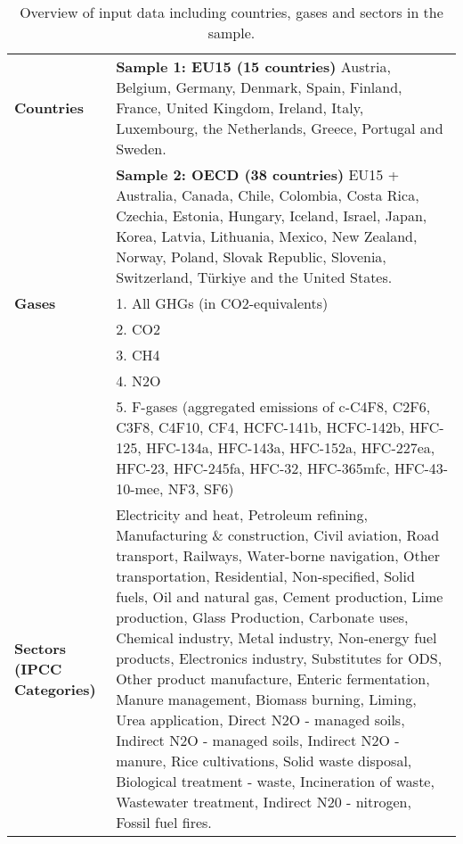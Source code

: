 \documentclass[a4paper]{article}
\begin{document}
\begin{table}
    \centering
    \caption{Overview of input data including countries, gases and sectors in the sample.}
    \renewcommand{\arraystretch}{1.5}
    \begin{adjustbox}{center}
    \begin{tabular}{p{2.5cm} p{14cm}}
    \hline
        \textbf{Countries} & \textbf{Sample 1: EU15 (15 countries)}
                    Austria, Belgium, Germany, Denmark, Spain, Finland, France, United Kingdom, Ireland, Italy, Luxembourg, the Netherlands, Greece, Portugal and Sweden. \\
                  & \textbf{Sample 2: OECD (38 countries)}
                    EU15 + Australia, Canada, Chile, Colombia, Costa Rica, Czechia, Estonia, Hungary, Iceland, Israel, Japan, Korea, Latvia, Lithuania, Mexico, New Zealand, Norway, Poland, Slovak Republic, Slovenia, Switzerland, Türkiye and the United States. \\ \hline
         \textbf{Gases}    & 1. All GHGs (in CO2-equivalents) \\
                  & 2. CO2 \\
                  & 3. CH4 \\
                  & 4. N2O \\
                  & 5. F-gases (aggregated emissions of c-C4F8, C2F6, C3F8, C4F10, CF4, HCFC-141b, HCFC-142b, HFC-125, HFC-134a, HFC-143a, HFC-152a, HFC-227ea, HFC-23, HFC-245fa, HFC-32, HFC-365mfc, HFC-43-10-mee, NF3, SF6) \\ \hline
         \textbf{Sectors (IPCC Categories)} & Electricity and heat, Petroleum refining, Manufacturing \& construction, Civil aviation, Road transport, Railways, Water-borne navigation, Other transportation, Residential, Non-specified, Solid fuels, Oil and natural gas, Cement production, Lime production, Glass Production, Carbonate uses, Chemical industry, Metal industry, Non-energy fuel products, Electronics industry, Substitutes for ODS, Other product manufacture, Enteric fermentation, Manure management, Biomass burning, Liming, Urea application, Direct N2O - managed soils, Indirect N2O  - managed soils, Indirect N2O - manure, Rice cultivations, Solid waste disposal, Biological treatment - waste, Incineration of waste, Wastewater treatment, Indirect N20 - nitrogen, Fossil fuel fires. \\ \hline
    \end{tabular}
    \label{tab:data_inputs}
    \end{adjustbox}
\end{table}
\end{document}
